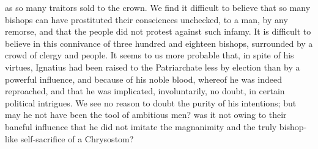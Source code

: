 as so many traitors sold to the crown. We find it difficult to believe that so many bishops can have prostituted their consciences unchecked, to a man, by any remorse, and that the people did not protest against such infamy. It is difficult to believe in this connivance of three hundred and eighteen bishops, surrounded by a crowd of clergy and people. It seems to us more probable that, in spite of his virtues, Ignatius had been raised to the Patriarchate less by election than by a powerful influence, and because of his noble blood, whereof he was indeed reproached, and that he was implicated, involuntarily, no doubt, in certain political intrigues. We see no reason to doubt the purity of his intentions; but may he not have been the tool of ambitious men? was it not owing to their baneful influence that he did not imitate the magnanimity and the truly bishop-like self-sacrifice of a Chrysostom?

